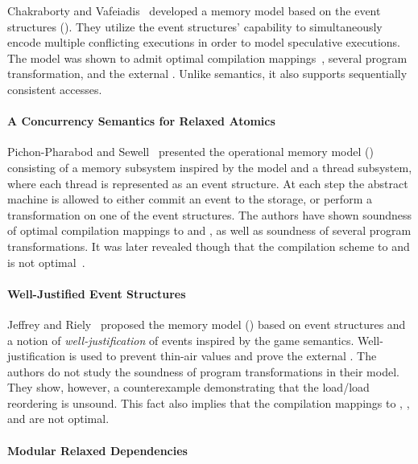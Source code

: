 Chakraborty and Vafeiadis~\cite{Chakraborty-Vafeiadis:CGO17, Chakraborty-Vafeiadis:POPL19}
developed a memory model based on the event structures (\WMO). 
They utilize the event structures' capability to simultaneously encode 
multiple conflicting executions in order to model speculative executions.
The model was shown to admit optimal compilation mappings~\cite{Moiseenko-al:ECOOP20},
several program transformation, and the external \DRF.
Unlike \Promising semantics, it also supports 
sequentially consistent accesses.

\paragraph{A Concurrency Semantics for Relaxed Atomics}

Pichon-Pharabod and Sewell~\cite{PichonPharabod-Sewell:POPL16} 
presented the operational memory model (\CSRA) consisting of 
a memory subsystem inspired by the \POWER model 
and a thread subsystem, 
where each thread is represented as an event structure. 
At each step the abstract machine is allowed to either 
commit an event to the storage, or perform a transformation 
on one of the event structures. 
The authors have shown soundness of 
optimal compilation mappings to \Intel and \POWER, 
as well as soundness of several program transformations.
It was later revealed though that the compilation scheme
to  and  is not optimal~\cite{PichonPharabod:PhD18}.

\paragraph{Well-Justified Event Structures}

Jeffrey and Riely~\cite{Jeffrey-Riely:LICS16} proposed 
the memory model (\WJES) based on event structures and a notion of 
\emph{well-justification} of events inspired by the game semantics. 
Well-justification is used to prevent thin-air values 
and prove the external \DRF. The authors do not study 
the soundness of program transformations in their model. 
They show, however, a counterexample demonstrating that 
the load/load reordering is unsound. 
This fact also implies that 
the compilation mappings to , , and \POWER 
are not optimal.   

\paragraph{Modular Relaxed Dependencies}

